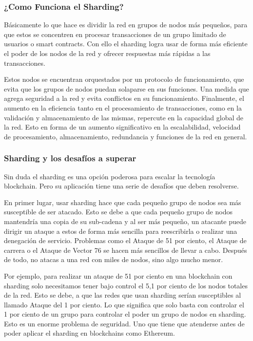 \documentclass[twoside,twocolumn]{article}
\begin{document}
\subsubsection{¿Como Funciona el Sharding?}
Básicamente lo que hace es dividir la red
 en grupos de nodos más pequeños, para que 
 estos se concentren en procesar transacciones 
 de un grupo limitado de usuarios o smart contracts.
  Con ello el sharding logra usar de forma más eficiente
   el poder de los nodos de la red y ofrecer respuestas más
    rápidas a las transacciones.

Estos nodos se encuentran orquestados por un 
protocolo de funcionamiento, que evita que los grupos de 
nodos puedan solaparse en sus funciones. Una medida que agrega seguridad 
a la red y evita conflictos en su funcionamiento.  Finalmente, el aumento en 
la eficiencia tanto en el procesamiento de transacciones, como en la validación
 y almacenamiento de las mismas, repercute en la capacidad global de la red.
  Esto en forma de un aumento significativo en la escalabilidad, velocidad de 
  procesamiento, almacenamiento, 
redundancia y funciones de la red en general.


   
\subsubsection{Sharding y los desafíos a superar}

Sin duda el sharding es una opción poderosa para escalar 
la tecnología blockchain. Pero su aplicación tiene una serie 
de desafíos que deben resolverse.

En primer lugar, usar sharding hace que cada pequeño grupo de
 nodos sea más susceptible de ser atacado. Esto se debe a que
  cada pequeño grupo de nodos mantendría una copia de su sub-cadena
   y al ser más pequeño, un atacante puede dirigir un ataque a estos
    de forma más sencilla para reescribirla o realizar una denegación 
    de servicio. Problemas como el Ataque de 51 por ciento,
 el Ataque de carrera o el Ataque de Vector 76 se hacen más 
 sencillos de llevar a cabo. Después de todo, no atacas a una red
  con miles de nodos, sino algo mucho menor.

Por ejemplo, para realizar un ataque de 51 por ciento
 en una blockchain con sharding solo necesitamos tener bajo 
 control el 5,1 por ciento
  de los nodos totales de la red. Esto se debe,
   a que las redes que usan sharding serían susceptibles 
   al llamado Ataque del 1 por ciento. Lo que significa que solo
    basta con controlar el 1 por ciento
     de un grupo para controlar el poder un grupo de nodos en sharding.
      Esto es un enorme problema de seguridad. Uno que tiene que atenderse
       antes de poder aplicar el sharding en blockchains como Ethereum.
\end{document}
